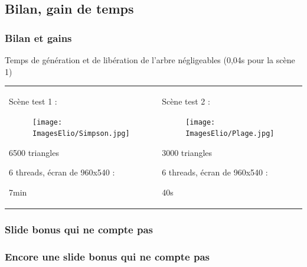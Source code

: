 \subsection{Bilan, gain de temps}
\begin{frame}[fragile]
\frametitle{Bilan et gains}
\label{derniere_slide_effective}
\end{frame}

Temps de génération et de libération de l'arbre négligeables (0,04s pour la scène 1)
\medskip 

\begin{tabular}{p{}p{}}
    \flushleft  
    Scène test 1 :  
    \medskip 
    
    \begin{figure}
        \texttt{[image: ImagesElio/Simpson.jpg]}
    \end{figure}
    \medskip

    6500 triangles
    \smallskip

    6 threads, écran de 960x540 :

    \hspace{1cm}
    7min
    
        & \flushright 
        Scène test 2 : 
        \medskip 

            \begin{figure}[H]
                \texttt{[image: ImagesElio/Plage.jpg]}
            \end{figure}
            \medskip 

            3000 triangles 
            \medskip 

            6 threads, écran de 960x540 :

            \hspace{1cm}
            40s
    \end{tabular}


\begin{frame}[fragile]
\frametitle{Slide bonus qui ne compte pas}
\end{frame}


\begin{frame}[fragile]
\frametitle{Encore une slide bonus qui ne compte pas}
\end{frame}
\addtocounter{framenumber}{-2} 


